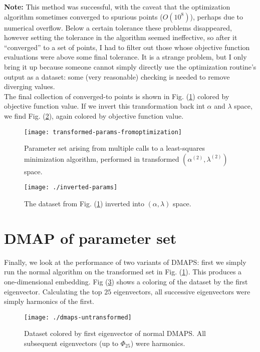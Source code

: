 \documentclass[11pt]{article}
\begin{document}
\textbf{Note:} This method was successful, with the caveat that the
optimization algorithm sometimes converged to spurious points
($O(10^8)$), perhaps due to numerical overflow. Below a certain
tolerance these problems disappeared, however setting the tolerance in
the algorithm seemed ineffective, so after it ``converged'' to a set
of points, I had to filter out those whose objective function
evaluations were above some final tolerance. It is a strange problem,
but I only bring it up because someone cannot simply directly use the
optimization routine's output as a dataset: some (very reasonable)
checking is needed to remove diverging values. \\

The final collection of converged-to points is shown in
Fig. (\ref{fig:tparams}) colored by objective function value. If we
invert this transformation back int $\alpha$ and $\lambda$ space, we
find Fig. (\ref{fig:utparams}), again colored by objective function
value.

\begin{figure}[htbp]
  \centering
  \texttt{[image: transformed-params-fromoptimization]}
  \caption{Parameter set arising from multiple calls to a
    least-squares minimization algorithm, performed in transformed
    $(\alpha^{(2)}, \lambda^{(2)})$ space. \label{fig:tparams}}
\end{figure}

\begin{figure}[htbp]
  \centering
  \texttt{[image: ./inverted-params]}
  \caption{The dataset from Fig. (\ref{fig:tparams}) inverted into
    $(\alpha, \lambda)$ space. \label{fig:utparams}}
\end{figure}

\section{DMAP of parameter set}

Finally, we look at the performance of two variants of DMAPS: first we
simply run the normal algorithm on the transformed set in
Fig. (\ref{fig:tparams}). This produces a one-dimensional
embedding. Fig (\ref{fig:utdmaps}) shows a coloring of the dataset by
the first eigenvector. Calculating the top $25$ eigenvectors, all
successive eigenvectors were simply harmonics of the first. \\

\begin{figure}[htbp]
  \centering
  \texttt{[image: ./dmaps-untransformed]}
  \caption{Dataset colored by first eigenvector of normal DMAPS. All
    subsequent eigenvectors (up to $\Phi_{25}$) were harmonics. \label{fig:utdmaps}}
\end{figure}
\end{document}
